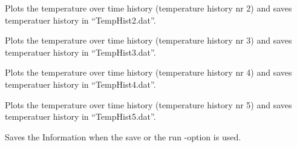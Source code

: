 \documentclass[letterpaper,10pt,english]{sphinxmanual}
\begin{document}
\begin{fulllineitems}
\begin{fulllineitems}
\end{fulllineitems}


\begin{fulllineitems}
\label{GUI:GUI.Ui_PKP.Plot2}
Plots the temperature over time history (temperature history nr 2) and saves temperatuer history in ``TempHist2.dat''.

\end{fulllineitems}


\begin{fulllineitems}
\label{GUI:GUI.Ui_PKP.Plot3}
Plots the temperature over time history (temperature history nr 3) and saves temperatuer history in ``TempHist3.dat''.

\end{fulllineitems}


\begin{fulllineitems}
\label{GUI:GUI.Ui_PKP.Plot4}
Plots the temperature over time history (temperature history nr 4) and saves temperatuer history in ``TempHist4.dat''.

\end{fulllineitems}


\begin{fulllineitems}
\label{GUI:GUI.Ui_PKP.Plot5}
Plots the temperature over time history (temperature history nr 5) and saves temperatuer history in ``TempHist5.dat''.

\end{fulllineitems}


\begin{fulllineitems}
\label{GUI:GUI.Ui_PKP.SaveInfos}
Saves the Information when the save or the run -option is used.

\end{fulllineitems}


\end{fulllineitems}
\end{document}
